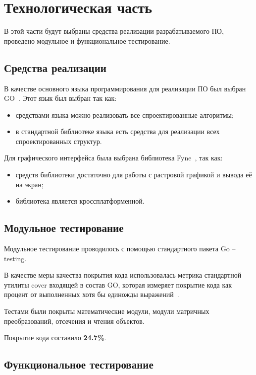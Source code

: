 \chapter{Технологическая часть}

В этой части будут выбраны средства реализации разрабатываемого ПО, проведено модульное и функциональное тестирование.

\section{Средства реализации}

В качестве основного языка программирования для реализации ПО был выбран GO~\cite{go}. Этот язык был выбран так как:

\begin{itemize}
	\item средствами языка можно реализовать все спроектированные алгоритмы;
	\item в стандартной библиотеке языка есть средства для реализации всех спроектированных структур.
\end{itemize}

Для графического интерфейса была выбрана библиотека Fyne~\cite{fyne}, так как:

\begin{itemize}
	\item средств библиотеки достаточно для работы с растровой графикой и вывода её на экран;
	\item библиотека является кроссплатформенной.
\end{itemize}

\section{Модульное тестирование}

Модульное тестирование проводилось с помощью стандартного пакета Go -- testing. 

В качестве меры качества покрытия кода использовалась метрика стандартной утилиты cover входящей в состав GO, которая измеряет покрытие кода как процент от выполненных хотя бы единожды выражений~\cite{cover}.

Тестами были покрыты математические модули, модули матричных преобразований, отсечения и чтения объектов.

Покрытие кода составило \textbf{24.7\%}.

\section{Функциональное тестирование}

